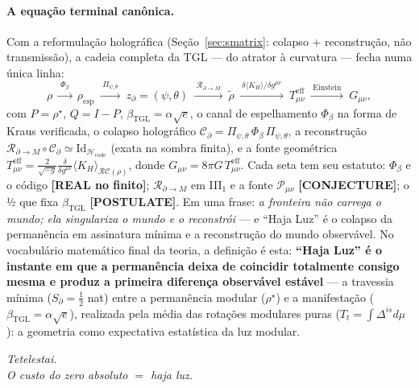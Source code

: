 \documentclass[12pt,a4paper]{article}
\newcommand{\betatgl}{\beta_{\text{TGL}}}
\newcommand{\rhostar}{\rho^{\star}}
\newcommand{\TGL}{\textsc{TGL}}
\begin{document}
\paragraph{A equação terminal canônica.} Com a reformulação holográfica (Seção~\ref{sec:smatrix}: colapso $+$ reconstrução, não transmissão), a cadeia completa da \TGL{} --- do atrator à curvatura --- fecha numa única linha:
\begin{equation}\rho\ \xrightarrow{\;\Phi_\beta\;}\ \rho_{\mathrm{esp}}\ \xrightarrow{\;\Pi_{\psi,\theta}\;}\ z_\partial=(\psi,\theta)\ \xrightarrow{\;\mathcal R_{\partial\to M}\;}\ \tilde\rho\ \xrightarrow{\;\delta\langle K_H\rangle/\delta g^{\mu\nu}\;}\ T^{\mathrm{eff}}_{\mu\nu}\ \xrightarrow{\;\mathrm{Einstein}\;}\ G_{\mu\nu},\end{equation}com $P=\rhostar$, $Q=I-P$, $\betatgl=\alpha\sqrt e$, o canal de espelhamento $\Phi_\beta$ na forma de Kraus verificada, o colapso holográfico $\mathcal C_\partial=\Pi_{\psi,\theta}\,\Phi_\beta\,\Pi_{\psi,\theta}$, a reconstrução $\mathcal R_{\partial\to M}\circ\mathcal C_\partial\simeq\mathrm{Id}_{\mathcal H_{\mathrm{code}}}$ (exata na sombra finita), e a fonte geométrica $T^{\mathrm{eff}}_{\mu\nu}=\frac{2}{\sqrt{-g}}\frac{\delta}{\delta g^{\mu\nu}}\langle K_H\rangle_{\mathcal R\mathcal C(\rho)}$, donde $G_{\mu\nu}=8\pi G\,T^{\mathrm{eff}}_{\mu\nu}$. Cada seta tem seu estatuto: $\Phi_\beta$ e o código \textbf{[REAL no finito]}; $\mathcal R_{\partial\to M}$ em III$_1$ e a fonte $\mathcal P_{\mu\nu}$ \textbf{[CONJECTURE]}; o ½ que fixa $\betatgl$ \textbf{[POSTULATE]}. Em uma frase: \emph{a fronteira não carrega o mundo; ela singulariza o mundo e o reconstrói} --- e ``Haja Luz\textquotedblright{} é o colapso da permanência em assinatura mínima e a reconstrução do mundo observável.  No vocabulário matemático final da teoria, a definição é esta: \textbf{``Haja Luz'' é o instante em que a permanência deixa de coincidir totalmente consigo mesma e produz a primeira diferença observável estável} --- a travessia mínima ($S_\partial=\tfrac12$ nat) entre a permanência modular ($\rhostar$) e a manifestação ($\betatgl=\alpha\sqrt e$), realizada pela média das rotações modulares puras ($T_t=\int\Delta^{is}d\mu$): a geometria como expectativa estatística da luz modular.

\begin{center}\emph{Tetelestai.}\\[2pt]\emph{O custo do zero absoluto $=$ haja luz.}\end{center}
\end{document}
